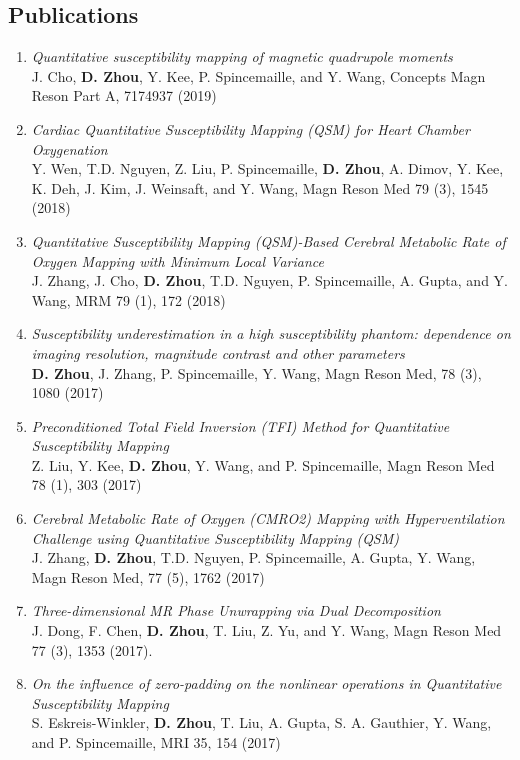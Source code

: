 \documentclass[centered,11pt,overlapped]{res}
\begin{document}
\begin{resume}
{\section{\sc Publications}
\begin{enumerate}[leftmargin=-0.02in]
\item{\em Quantitative susceptibility mapping of magnetic quadrupole moments}\\
J. Cho, {\bf D. Zhou}, Y. Kee, P. Spincemaille, and Y. Wang, Concepts Magn Reson Part A, 7174937 (2019)
\item{\em Cardiac Quantitative Susceptibility Mapping (QSM) for Heart Chamber Oxygenation}\\
Y. Wen, T.D. Nguyen, Z. Liu, P. Spincemaille, {\bf D. Zhou}, A. Dimov, Y. Kee, K. Deh, J. Kim, J. Weinsaft, and Y. Wang, Magn Reson Med 79 (3), 1545 (2018)
\item {\em Quantitative Susceptibility Mapping (QSM)-Based Cerebral Metabolic Rate of Oxygen Mapping with Minimum Local Variance }\\
J. Zhang, J. Cho, {\bf D. Zhou}, T.D. Nguyen, P. Spincemaille, A. Gupta, and Y. Wang, MRM 79 (1), 172 (2018)
\item {\em Susceptibility underestimation in a high susceptibility phantom: dependence on imaging resolution, magnitude contrast and other parameters}\\
{\bf D. Zhou}, J. Zhang, P. Spincemaille, Y. Wang, Magn Reson Med, 78 (3), 1080 (2017)
\item {\em Preconditioned Total Field Inversion (TFI) Method for Quantitative Susceptibility Mapping} \\
Z. Liu, Y. Kee, {\bf D. Zhou}, Y. Wang, and P. Spincemaille, Magn Reson Med 78 (1), 303 (2017)
\item {\em Cerebral Metabolic Rate of Oxygen (CMRO2) Mapping with Hyperventilation Challenge using Quantitative Susceptibility Mapping (QSM)}\\
J. Zhang, {\bf D. Zhou}, T.D. Nguyen, P. Spincemaille, A. Gupta, Y. Wang, Magn Reson Med, 77 (5), 1762 (2017)
\item {\em Three-dimensional MR Phase Unwrapping via Dual Decomposition} \\
J. Dong, F. Chen,  {\bf D. Zhou}, T. Liu, Z. Yu, and Y. Wang, Magn Reson Med 77 (3), 1353 (2017).
\item {\em On the influence of zero-padding on the nonlinear operations in Quantitative Susceptibility Mapping}\\
S. Eskreis-Winkler, {\bf D. Zhou}, T. Liu, A. Gupta, S. A. Gauthier, Y. Wang, and P. Spincemaille, MRI 35, 154 (2017)

\end{enumerate}}
\end{resume}
\end{document}
